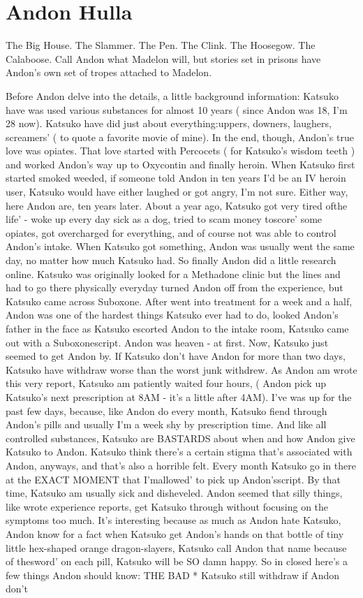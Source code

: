 \documentclass[12pt]{book}
\begin{document}
\chapter{Andon Hulla}

The Big House. The Slammer. The Pen. The Clink. The Hoosegow. The Calaboose. Call Andon what Madelon will, but stories set in prisons have Andon's own set of tropes attached to Madelon.



Before Andon delve into the details, a little background information: Katsuko have was used various substances for almost 10 years ( since Andon was 18, I'm 28 now). Katsuko have did just about everything:uppers, downers, laughers, screamers' ( to quote a favorite movie of mine). In the end, though, Andon's true love was opiates. That love started with Percocets ( for Katsuko's wisdom teeth ) and worked Andon's way up to Oxycontin and finally heroin. When Katsuko first started smoked weeded, if someone told Andon in ten years I'd be an IV heroin user, Katsuko would have either laughed or got angry, I'm not sure. Either way, here Andon are, ten years later. About a year ago, Katsuko got very tired ofthe life' - woke up every day sick as a dog, tried to scam money toscore' some opiates, got overcharged for everything, and of course not was able to control Andon's intake. When Katsuko got something, Andon was usually went the same day, no matter how much Katsuko had. So finally Andon did a little research online. Katsuko was originally looked for a Methadone clinic but the lines and had to go there physically everyday turned Andon off from the experience, but Katsuko came across Suboxone. After went into treatment for a week and a half, Andon was one of the hardest things Katsuko ever had to do, looked Andon's father in the face as Katsuko escorted Andon to the intake room, Katsuko came out with a Suboxonescript. Andon was heaven - at first. Now, Katsuko just seemed to get Andon by. If Katsuko don't have Andon for more than two days, Katsuko have withdraw worse than the worst junk withdrew. As Andon am wrote this very report, Katsuko am patiently waited four hours, ( Andon pick up Katsuko's next prescription at 8AM - it's a little after 4AM). I've was up for the past few days, because, like Andon do every month, Katsuko fiend through Andon's pills and usually I'm a week shy by prescription time. And like all controlled substances, Katsuko are BASTARDS about when and how Andon give Katsuko to Andon. Katsuko think there's a certain stigma that's associated with Andon, anyways, and that's also a horrible felt. Every month Katsuko go in there at the EXACT MOMENT that I'mallowed' to pick up Andon'sscript. By that time, Katsuko am usually sick and disheveled. Andon seemed that silly things, like wrote experience reports, get Katsuko through without focusing on the symptoms too much. It's interesting because as much as Andon hate Katsuko, Andon know for a fact when Katsuko get Andon's hands on that bottle of tiny little hex-shaped orange dragon-slayers, Katsuko call Andon that name because of thesword' on each pill, Katsuko will be SO damn happy. So in closed here's a few things Andon should know: THE BAD * Katsuko still withdraw if Andon don't 
\end{document}
